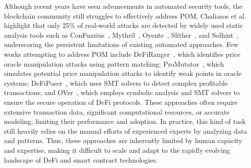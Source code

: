 Although recent years have seen advancements in automated security tools, the blockchain community still struggles to effectively address POM. 
Chaliasos et al.~\cite{chaliasos2024smart} highlight that only 25\% of real-world attacks are detected by widely used static analysis tools such as ConFuzzius~\cite{torres2021confuzzius}, Mythril~\cite{consensys2024mythril}, Oyente~\cite{luu2016oyente}, Slither~\cite{feist2019slither}, and Solhint~\cite{protofire2024solhint}, underscoring the persistent limitations of existing automated approaches.
Few works attempting to address POM include DeFiRanger~\cite{wu2021defiranger}, which identifies price oracle manipulation attacks using pattern matching; ProMutator~\cite{wang2021promutator}, which simulates potential price manipulation attacks to identify weak points in oracle systems; DeFiPoser~\cite{zhou2021defiposer}, which uses SMT solvers to detect complex profitable transactions; and OVer~\cite{deng2024safeguarding}, which employs symbolic analysis and SMT solvers to ensure the secure operation of DeFi protocols.
These approaches often require extensive transaction data, significant computational resources, or accurate modeling, limiting their performance and adoption.
In practice, this kind of task still heavily relies on the manual efforts of experienced experts by analyzing data and patterns.
Thus, these approaches are inherently limited by human capacity and expertise, making it difficult to scale and adapt to the rapidly evolving landscape of DeFi and smart contract technologies.


